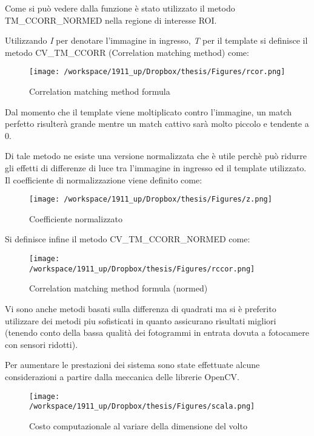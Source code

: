 Come si può vedere dalla funzione è stato utilizzato il metodo TM\_CCORR\_NORMED nella regione di interesse ROI. 

Utilizzando \textit{I} per denotare l'immagine in ingresso, \textit{T} per il template si definisce il metodo CV\_TM\_CCORR (Correlation matching method) come: 

\begin{figure}[H]\centering  
\texttt{[image: /workspace/1911\_up/Dropbox/thesis/Figures/rcor.png]}
\caption[Correlation matching method formula]{Correlation matching method formula}
\label{pic-a}
\end{figure}

Dal momento che il template viene moltiplicato contro l'immagine, un match perfetto risulterà grande mentre un match cattivo sarà molto piccolo e tendente a 0.

Di tale metodo ne esiste una versione normalizzata che è utile perchè può ridurre gli effetti di differenze di luce tra l'immagine in ingresso ed il template utilizzato. Il coefficiente di normalizzazione viene definito come:

\begin{figure}[H]\centering  
\texttt{[image: /workspace/1911\_up/Dropbox/thesis/Figures/z.png]}
\caption[Coefficiente normalizzato]{Coefficiente normalizzato}
\label{pic-a}
\end{figure}

Si definisce infine il metodo CV\_TM\_CCORR\_NORMED come:

\begin{figure}[H]\centering  
\texttt{[image: /workspace/1911\_up/Dropbox/thesis/Figures/rccor.png]}
\caption[Correlation matching method formula (normed)]{Correlation matching method formula (normed)}
\label{pic-a}
\end{figure}

Vi sono anche metodi basati sulla differenza di quadrati ma si è preferito utilizzare dei metodi piu sofisticati in quanto assicurano risultati migliori (tenendo conto della bassa qualità dei fotogrammi in entrata dovuta a fotocamere con sensori ridotti). 

Per aumentare le prestazioni dei sistema sono state effettuate alcune considerazioni a partire dalla meccanica delle librerie OpenCV.

		\begin{figure}[H]\centering  
\texttt{[image: /workspace/1911\_up/Dropbox/thesis/Figures/scala.png]}
\caption[Costo computazionale al variare della dimensione del volto]{Costo computazionale al variare della dimensione del volto}
\label{pic-a}
\end{figure}

